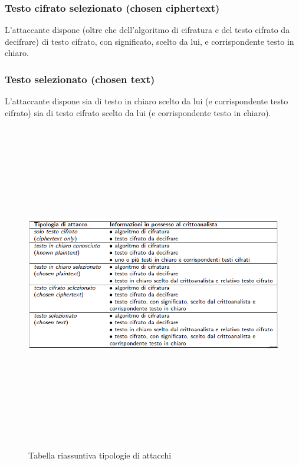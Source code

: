 \subsubsection{Testo cifrato selezionato (chosen ciphertext)}
L'attaccante dispone (oltre che dell'algoritmo di cifratura e del testo cifrato da decifrare) di testo cifrato, con significato, scelto da lui, e corrispondente testo in chiaro.
\subsubsection{Testo selezionato (chosen text)}
L'attaccante dispone sia di testo in chiaro scelto da lui (e corrispondente testo cifrato) sia di testo cifrato scelto da lui (e corrispondente testo in chiaro).
\begin{figure}[htbp]
	\centering%
	\subfigure%
	{\includegraphics[height=14cm, width=15cm, keepaspectratio]{Immagini/introduzione/tab_attacchi_cifrari.png}}
	\caption{Tabella riassuntiva tipologie di attacchi \label{fig:tab_attacchi_cifrari}} 	
\end{figure}
